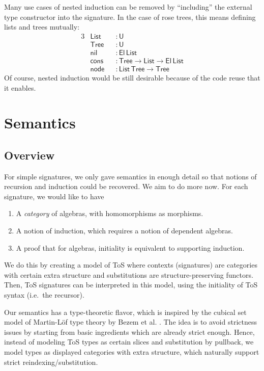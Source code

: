 \documentclass[12pt,a4paper,twoside,openany]{book}
\theoremstyle{remark}
\theoremstyle{definition}
\theoremstyle{theorem}
\newcommand{\ms}[1]{\mathsf{#1}}
\newcommand{\U}{\mathsf{U}}
\newcommand{\El}{\mathsf{El}}
\begin{document}
Many use cases of nested induction can be removed by ``including'' the external
type constructor into the signature. In the case of rose trees, this means
defining lists and trees mutually:
\begin{alignat*}{3}
  &\ms{List} &&: \U\\
  &\ms{Tree} &&: \U\\
  &\ms{nil}  &&: \El\,\ms{List}\\
  &\ms{cons} &&: \ms{Tree} \to \ms{List} \to \El\,\ms{List}\\
  &\ms{node} &&: \ms{List}\,\ms{Tree} \to \ms{Tree}
\end{alignat*}
Of course, nested induction would be still desirable because of the code reuse
that it enables.

\section{Semantics}
\label{sec:fqiit-semantics}

\subsection{Overview}

For simple signatures, we only gave semantics in enough detail so that notions
of recursion and induction could be recovered. We aim to do more now. For each
signature, we would like to have
\begin{enumerate}
  \item A \emph{category} of algebras, with homomorphisms as morphisms.
  \item A notion of induction, which requires a notion of dependent algebras.
  \item A proof that for algebras, initiality is equivalent to supporting induction.
\end{enumerate}

We do this by creating a model of ToS where contexts (signatures) are categories
with certain extra structure and substitutions are structure-preserving
functors. Then, ToS signatures can be interpreted in this model, using the
initiality of ToS syntax (i.e.\ the recursor).

Our semantics has a type-theoretic flavor, which is inspired by the cubical set
model of Martin-Löf type theory by Bezem et al. \cite{cubical}. The idea is
to avoid strictness issues by starting from basic ingredients which are already
strict enough. Hence, instead of modeling ToS types as certain slices and
substitution by pullback, we model types as displayed categories with extra
structure, which naturally support strict reindexing/substitution.
\end{document}
